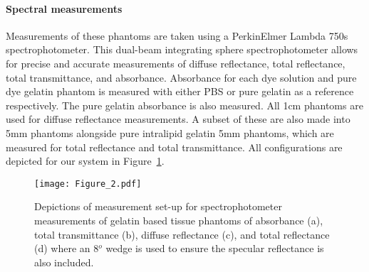 
\paragraph{Spectral measurements}\label{sec:methodsphantommeasure1}
Measurements of these phantoms are taken using a PerkinElmer Lambda 750s spectrophotometer. This dual-beam integrating sphere spectrophotometer allows for precise and accurate measurements of diffuse reflectance, total reflectance, total transmittance, and absorbance. Absorbance for each dye solution and pure dye gelatin phantom is measured with either PBS or pure gelatin as a reference respectively. The pure gelatin absorbance is also measured. 
All 1cm phantoms are used for diffuse reflectance measurements. A subset of these are also made into 5mm phantoms alongside pure intralipid gelatin 5mm phantoms, which are measured for total reflectance and total transmittance. 
All configurations are depicted for our system in Figure~\ref{fig:spectrophotometer}. 
\begin{figure}[t!]
    \centering
    \texttt{[image: Figure\_2.pdf]}
    \caption{Depictions of measurement set-up for spectrophotometer measurements of gelatin based tissue phantoms of absorbance (a), total transmittance (b), diffuse reflectance (c), and total reflectance (d) where an 8$^o$ wedge is used to ensure the specular reflectance is also included.}
    \label{fig:spectrophotometer}
\end{figure}

